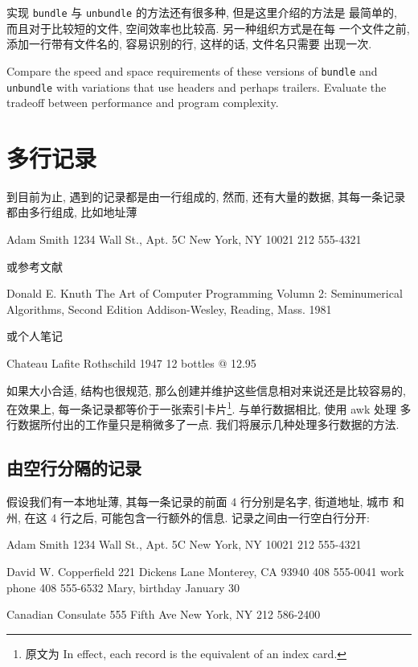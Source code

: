 实现 \verb'bundle' 与 \verb'unbundle' 的方法还有很多种, 但是这里介绍的方法是
最简单的, 而且对于比较短的文件, 空间效率也比较高. 另一种组织方式是在每
一个文件之前, 添加一行带有文件名的, 容易识别的行, 这样的话, 文件名只需要
出现一次.

\begin{exercise}
    Compare the speed and space requirements of these versions of
    \verb'bundle' and \verb'unbundle' with variations that use headers and
    perhaps trailers. Evaluate the tradeoff between performance and program
    complexity.
\end{exercise}

\section{多行记录}
\label{sec:multiline_records}

到目前为止, 遇到的记录都是由一行组成的, 然而, 还有大量的数据, 其每一条记录
都由多行组成, 比如地址薄
\begin{shell}
    Adam Smith
    1234 Wall St., Apt. 5C
    New York, NY 10021
    212 555-4321
\end{shell}
或参考文献
\begin{shell}
    Donald E. Knuth
    The Art of Computer Programming
    Volumn 2: Seminumerical Algorithms, Second Edition
    Addison-Wesley, Reading, Mass.
    1981
\end{shell}
或个人笔记
\begin{shell}
    Chateau Lafite Rothschild 1947
    12 bottles @ 12.95
\end{shell}

如果大小合适, 结构也很规范, 那么创建并维护这些信息相对来说还是比较容易的,
在效果上, 每一条记录都等价于一张索引卡片\footnote{原文为 In effect, each
record is the equivalent of an index card.}. 与单行数据相比, 使用 awk 处理 
多行数据所付出的工作量只是稍微多了一点. 我们将展示几种处理多行数据的方法.

\subsection{由空行分隔的记录}
\label{subsec:records_separated_by_blank_lines}

假设我们有一本地址薄, 其每一条记录的前面 4 行分别是名字, 街道地址, 城市
和州, 在这 4 行之后, 可能包含一行额外的信息. 记录之间由一行空白行分开:
\begin{shell}
    Adam Smith
    1234 Wall St., Apt. 5C
    New York, NY 10021
    212 555-4321

    David W. Copperfield
    221 Dickens Lane
    Monterey, CA 93940
    408 555-0041
    work phone 408 555-6532
    Mary, birthday January 30

    Canadian Consulate
    555 Fifth Ave
    New York, NY
    212 586-2400
\end{shell}
